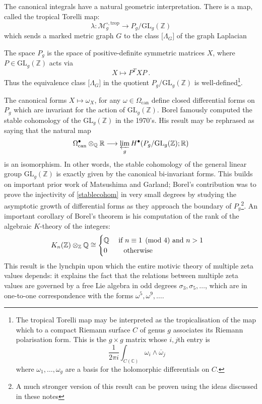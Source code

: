 \documentclass[12pt]{amsart}
\newcommand{\CC}{{\mathbb C}}
\newcommand{\QQ}{{\mathbb Q}}
\newcommand{\RR}{{\mathbb R}}
\newcommand{\ZZ}{{\mathbb Z}}
\theoremstyle{plain}
\newcommand{\GL}{\mathrm{GL}}
\newcommand{\trop}{\mathrm{trop}}
\newcommand{\To}{\longrightarrow}
\newcommand{\0}{\color{blue}{\mathsf{0}}}
\begin{document}
The canonical integrals have a natural geometric interpretation. There is a map, called the tropical Torelli map:
\[ \lambda:  \mathcal{M}_g^{\circ, \trop}  \To P_g/\GL_g(\ZZ)\]
which sends a marked metric graph $G$ to the class ${[}\Lambda_G]$ of the graph Laplacian



The space  $P_g$ is the space of positive-definite symmetric  matrices $X$, where $P\in \GL_g(\ZZ)$ acts via
\[   X \mapsto P^T  X P \ .\]
Thus the equivalence class ${[}\Lambda_G]$  in the quotient $P_g/\GL_g(\ZZ)$ is well-defined\footnote{The tropical Torelli map may be interpreted as the tropicalisation of the map which to a compact Riemann surface  $C$  of genus $g$ associates its Riemann polarisation form. This is the $g \times g$ matrix whose $i,j$th entry is 
\[  \frac{1}{2\pi i}  \int_{C(\CC)} \omega_i \wedge \overline{\omega}_j\] 
where $\omega_1,\ldots, \omega_g$ are a basis for the holomorphic differentials  on $C$. }.


The canonical forms $X\mapsto \omega_X$, for any $\omega \in \Omega_{\mathrm{can}}$  define closed differential forms on $P_g$ which are invariant for the action of $\GL_g(\ZZ)$.  Borel famously computed the stable cohomology of the $\GL_g(\ZZ)$ in the 1970's. His result may be rephrased as saying that the natural map
\begin{equation}\label{stablecohom} \Omega^{\bullet}_{\mathrm{can}}\otimes_{\QQ} \RR \To  \varprojlim_g  H^{\bullet}( P_g/\GL_g(\ZZ); \RR)\end{equation}
is an isomorphism. In other words, the stable cohomology of the general linear group $\GL_g(\ZZ)$ is exactly given by the canonical bi-invariant forms. This builds on important prior work of Matsushima and Garland;  Borel's contribution was to prove the injectivity of \eqref{stablecohom} in very small degrees by studying the asymptotic growth of differential forms as they approach the boundary of $P_g$\footnote{A much stronger version of this result \cite{brown2023bordifications} can be proven using the ideas discussed in these notes}.  An important corollary of Borel's theorem is his computation of the rank of the algebraic $K$-theory of the integers:
\[  K_{n}(\ZZ)\otimes_{\ZZ} \QQ \cong  \begin{cases}   \QQ \quad  \hbox{  if } n\equiv 1 \pmod 4 \hbox{ and } n>1 \\ 
 0 \qquad  \hbox{ otherwise}  \end{cases}\]  
 This result is the lynchpin upon which the entire motivic theory of multiple zeta values depends: it explains the fact that the relations between multiple zeta values are governed by a free Lie algebra in odd degrees $\sigma_3,\sigma_5,\ldots$, which are in one-to-one correspondence  with the forms $\omega^5, \omega^9 ,\ldots $.
 
\end{document}
